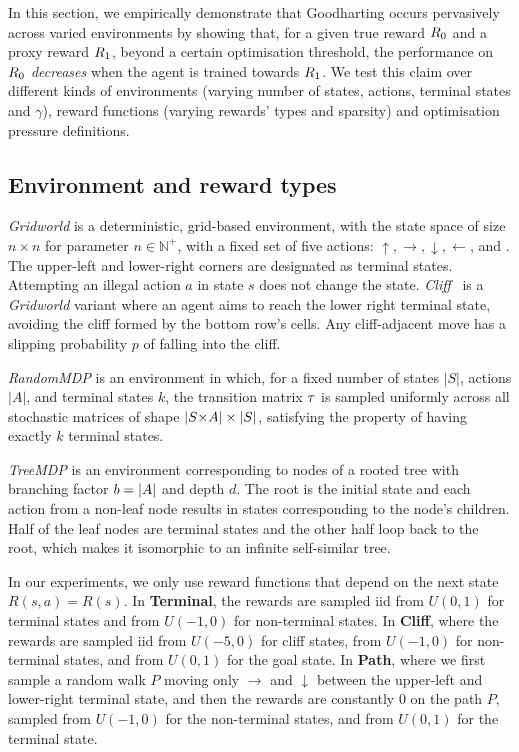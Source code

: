 In this section, we empirically demonstrate that Goodharting occurs pervasively across varied environments by showing that, for a given true reward $R_0$ and a proxy reward $R_1$, beyond a certain optimisation threshold, the performance on $R_0$ \emph{decreases} when the agent is trained towards $R_1$. We test this claim over different kinds of environments (varying number of states, actions, terminal states and $\gamma$), reward functions (varying rewards' types and sparsity) and optimisation pressure definitions.

\subsection{Environment and reward types}

\emph{Gridworld} is a deterministic, grid-based environment, with the state space of size $n \times n$ for parameter $n \in \mathbb{N}^+$, with a fixed set of five actions: $\uparrow, \rightarrow, \downarrow, \leftarrow$, and . The upper-left and lower-right corners are designated as terminal states. Attempting an illegal action $a$ in state $s$ does not change the state. \emph{Cliff}~\citep[Example 6.6]{sutton2018} is a \emph{Gridworld} variant where an agent aims to reach the lower right terminal state, avoiding the cliff formed by the bottom row's cells. Any cliff-adjacent move has a slipping probability $p$ of falling into the cliff.

\emph{RandomMDP} is an environment in which, for a fixed number of states $|S|$, actions $|A|$, and terminal states $k$, the transition matrix $\tau$ is sampled uniformly across all stochastic matrices of shape $|{S{\times}A}|\times |S|$, satisfying the property of having exactly $k$ terminal states.

\emph{TreeMDP} is an environment corresponding to nodes of a rooted tree with branching factor $b = |A|$ and depth $d$. The root is the initial state and each action from a non-leaf node results in states corresponding to the node's children. Half of the leaf nodes are terminal states and the other half loop back to the root, which makes it isomorphic to an infinite self-similar tree.

In our experiments, we only use reward functions that depend on the next state $R(s, a) = R(s)$. In \textbf{Terminal}, the rewards are sampled iid from $U(0, 1)$ for terminal states and from $U(-1, 0)$ for non-terminal states. In \textbf{Cliff}, where the rewards are sampled iid from $U(-5, 0)$ for cliff states, from $U(-1, 0)$ for non-terminal states, and from $U(0, 1)$ for the goal state. In \textbf{Path}, where we first sample a random walk $P$ moving only $\rightarrow$ and $\downarrow$ between the upper-left and lower-right terminal state, and then the rewards are constantly 0 on the path $P$, sampled from $U(-1, 0)$ for the non-terminal states, and from $U(0, 1)$ for the terminal state.

